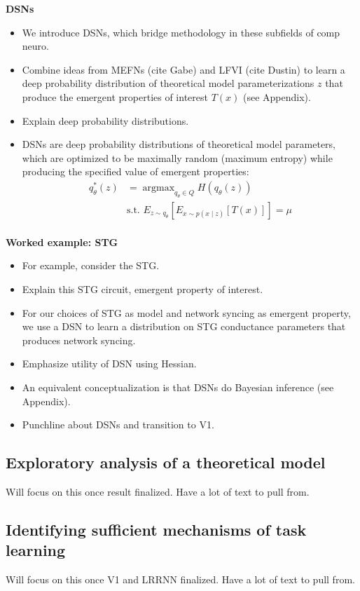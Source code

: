 \documentclass[11pt]{article}
\DeclareMathOperator*{\argmax}{argmax}
\begin{document}
\textbf{DSNs}
\begin{itemize}
\item We introduce DSNs, which bridge methodology in these subfields of comp neuro.
\item  Combine ideas from MEFNs (cite Gabe) and LFVI (cite Dustin) to learn a deep probability distribution of theoretical model parameterizations $z$ that produce the emergent properties of interest $T(x)$ (see Appendix).  
\item Explain deep probability distributions.
\item DSNs are deep probability distributions of theoretical model parameters, which are optimized to be maximally random (maximum entropy) while producing the specified value of emergent properties:
\begin{equation}
\begin{split}
q_\theta^*(z) &= \argmax_{q_\theta \in Q} H(q_\theta(z)) \\
 &  \text{s.t.  } E_{z \sim q_\theta}\left[ E_{x\sim p(x \mid z)}\left[T(x)\right] \right] = \mu \\
 \end{split}
\end{equation}
\end{itemize}

\textbf{Worked example: STG}
\begin{itemize}
\item For example, consider the STG.
\item Explain this STG circuit, emergent property of interest.
\item  For our choices of STG as model and network syncing as emergent property, we use a DSN to learn a distribution on STG conductance parameters that produces network syncing.  
\item Emphasize utility of DSN using Hessian.
\item An equivalent conceptualization is that DSNs do Bayesian inference (see Appendix).
\item Punchline about DSNs and transition to V1.
\end{itemize}

\subsection{Exploratory analysis of a theoretical model}
Will focus on this once result finalized.  Have a lot of text to pull from.

\subsection{Identifying sufficient mechanisms of task learning}
Will focus on this once V1 and LRRNN finalized.  Have a lot of text to pull from.
\end{document}
